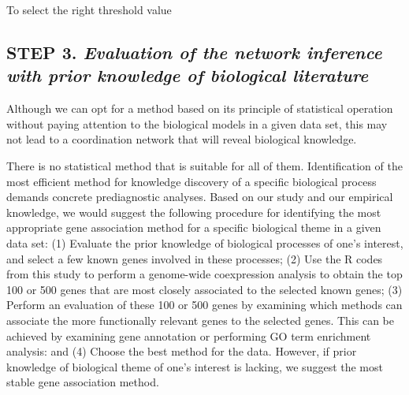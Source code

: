 To select the right threshold value

\subsection*{\textbf{STEP 3. }\textit{Evaluation of the network inference with prior knowledge of biological literature}} 

Although we can opt for a method based on its principle of statistical operation without paying attention to the biological models in a given data set, this may not lead to a coordination network that will reveal biological knowledge. 


There is no statistical method that is suitable for all of them. Identification of the most efficient method for knowledge discovery of a specific biological process demands concrete prediagnostic analyses. Based on our study and our empirical knowledge, we would suggest the following procedure for identifying the most appropriate gene association method for a specific biological theme in a given data set: (1) Evaluate the prior knowledge of biological processes of one’s interest, and select a few known genes involved in these processes; (2) Use the R codes from this study to perform a genome-wide coexpression analysis to obtain the top 100 or 500 genes that are most closely associated to the selected known genes; (3) Perform an evaluation of these 100 or 500 genes by examining which methods can associate the more functionally relevant genes to the selected genes. This can be achieved by examining gene annotation or performing GO term enrichment analysis: and (4) Choose the best method for the data. However, if prior knowledge of biological theme of one’s interest is lacking, we suggest the most stable gene association method.


